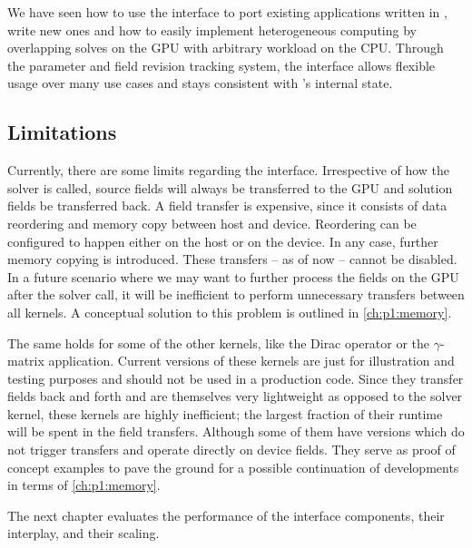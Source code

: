 We have seen how to use the interface to port existing applications written in \openqxd, write new ones and how to easily implement heterogeneous computing by overlapping solves on the GPU with arbitrary workload on the CPU.
Through the parameter and field revision tracking system, the interface allows flexible usage over many use cases and stays consistent with \openqxd's internal state.


\subsection{Limitations}

Currently, there are some limits regarding the interface.
Irrespective of how the solver is called, source fields will always be transferred to the GPU and solution fields be transferred back.
A field transfer is expensive, since it consists of data reordering and memory copy between host and device.
Reordering can be configured to happen either on the host or on the device.
In any case, further memory copying is introduced.
These transfers -- as of now -- cannot be disabled.
In a future scenario where we may want to further process the fields on the GPU after the solver call, it will be inefficient to perform unnecessary transfers between all kernels.
A conceptual solution to this problem is outlined in \cref{ch:p1:memory}.

The same holds for some of the other kernels, like the Dirac operator or the $\gamma$-matrix application.
Current versions of these kernels are just for illustration and testing purposes and should not be used in a production code.
Since they transfer fields back and forth and are themselves very lightweight as opposed to the solver kernel, these kernels are highly inefficient; the largest fraction of their runtime will be spent in the field transfers.
Although some of them have versions which do not trigger transfers and operate directly on device fields.
They serve as proof of concept examples to pave the ground for a possible continuation of developments in terms of \cref{ch:p1:memory}.

The next chapter evaluates the performance of the interface components, their interplay, and their scaling.

